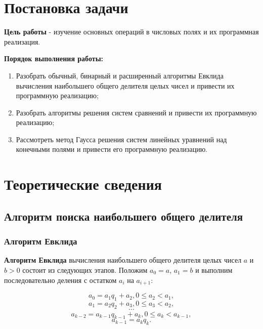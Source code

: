 \documentclass[bachelor, och, labwork]{SCWorks}
\begin{document}
\tableofcontents

\section{Постановка задачи}

    \textbf{Цель работы} - изучение основных операций в числовых полях и их
    программная реализация. 

    \begin{center}
        \textbf{Порядок выполнения работы:}
    \end{center}
    \begin{enumerate}
        \item Разобрать обычный, бинарный и расширенный алгоритмы Евклида
        вычисления наибольшего общего делителя целых чисел и привести их
        программную реализацию;
        \item Разобрать алгоритмы решения систем сравнений и привести их
        программную реализацию;
        \item Рассмотреть метод Гаусса решения систем линейных уравнений над
        конечными полями и привести его программную реализацию.
    \end{enumerate}

\section{Теоретические сведения}

    \subsection{Алгоритм поиска наибольшего общего делителя}
    \subsubsection{Алгоритм Евклида}

        \textbf{Алгоритм Евклида} вычисления наибольшего общего делителя целых
        чисел $a$ и $b
        > 0$ состоит из следующих этапов. Положим $a_0 = a$, $a_1 = b$ и выполним
        последовательно деления с остатком $a_i$ на $a_{i + 1}$:

        $$a_0 = a_1q_1 + a_2, 0 \leq a_2 < a_1,$$
        $$a_1 = a_2q_2 + a_3, 0 \leq a_3 < a_2,$$
        $$\cdots$$
        $$a_{k - 2} = a_{k - 1}q_{k - 1} + a_k, 0 \leq a_k < a_{k - 1},$$
        $$a_{k - 1} = a_k q_k.$$
\end{document}
